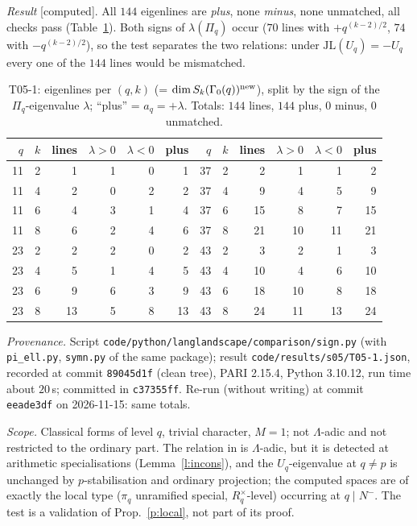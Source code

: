 \documentclass[11pt]{amsart}
\theoremstyle{plain}
\theoremstyle{remark}
\newcommand{\JL}{\mathrm{JL}}
\newcommand{\st}[1]{\textup{\textsf{[#1]}}}
\begin{document}
\emph{Result} \st{computed}. All $144$ eigenlines are \emph{plus}, none \emph{minus}, none unmatched, all checks pass
(Table~\ref{t:T051}). Both signs of $\lambda(\Pi_q)$ occur ($70$ lines with $+q^{(k-2)/2}$, $74$ with $-q^{(k-2)/2}$), so the
test separates the two relations: under $\JL(U_q)=-U_q$ every one of the $144$ lines would be mismatched.
\begin{table}[ht]
\centering\small
\begin{tabular}{rrrrrr@{\qquad}rrrrrr}
\toprule
$q$&$k$&lines&$\lambda>0$&$\lambda<0$&plus&$q$&$k$&lines&$\lambda>0$&$\lambda<0$&plus\\
\midrule
11&2&1&1&0&1   &37&2&2&1&1&2\\
11&4&2&0&2&2   &37&4&9&4&5&9\\
11&6&4&3&1&4   &37&6&15&8&7&15\\
11&8&6&2&4&6   &37&8&21&10&11&21\\
23&2&2&2&0&2   &43&2&3&2&1&3\\
23&4&5&1&4&5   &43&4&10&4&6&10\\
23&6&9&6&3&9   &43&6&18&10&8&18\\
23&8&13&5&8&13 &43&8&24&11&13&24\\
\bottomrule
\end{tabular}
\caption{T05-1: eigenlines per $(q,k)$ (= $\dim S_k(\Gamma_0(q))^{\rm new}$), split by the sign of the $\Pi_q$-eigenvalue
$\lambda$; ``plus'' = $a_q=+\lambda$. Totals: $144$ lines, $144$ plus, $0$ minus, $0$ unmatched.}\label{t:T051}
\end{table}

\emph{Provenance.} Script \texttt{code/python/langlandscape/comparison/sign.py} (with \texttt{pi\_ell.py}, \texttt{symn.py}
of the same package); result \texttt{code/results/s05/T05-1.json}, recorded at commit \texttt{89045d1f} (clean tree),
PARI 2.15.4, Python 3.10.12, run time about $20$\,s; committed in \texttt{c37355ff}. Re-run (without writing) at commit
\texttt{eeade3df} on 2026-11-15: same totals.

\emph{Scope.} Classical forms of level $q$, trivial character, $M=1$; not $\Lambda$-adic and not restricted to the
ordinary part. The relation in \cite{Hs} is $\Lambda$-adic, but it is detected at arithmetic specialisations
(Lemma~\ref{l:incons}), and the $U_q$-eigenvalue at $q\ne p$ is unchanged by $p$-stabilisation and ordinary projection;
the computed spaces are of exactly the local type ($\pi_q$ unramified special, $R_q^\times$-level) occurring at
$q\mid N^-$. The test is a validation of Prop.~\ref{p:local}, not part of its proof.
\end{document}
